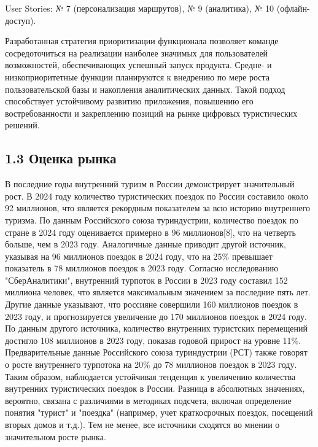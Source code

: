 User Stories: № 7 (персонализация маршрутов), № 9 (аналитика), № 10 (офлайн-доступ).

Разработанная стратегия приоритизации функционала позволяет команде сосредоточиться на реализации наиболее значимых для пользователей возможностей, обеспечивающих успешный запуск продукта. Средне- и низкоприоритетные функции планируются к внедрению по мере роста пользовательской базы и накопления аналитических данных. Такой подход способствует устойчивому развитию приложения, повышению его востребованности и закреплению позиций на рынке цифровых туристических решений.


\subsection*{1.3	Оценка рынка}


В последние годы внутренний туризм в России демонстрирует значительный рост. В 2024 году количество туристических поездок по России составило около 92 миллионов, что является рекордным показателем за всю историю внутреннего туризма. По данным Российского союза туриндустрии, количество поездок по стране в 2024 году оценивается примерно в 96 миллионов[8], что на четверть больше, чем в 2023 году. Аналогичные данные приводит другой источник, указывая на 96 миллионов поездок в 2024 году, что на 25\% превышает показатель в 78 миллионов поездок в 2023 году. Согласно исследованию "СберАналитики", внутренний турпоток в России в 2023 году составил 152 миллиона человек, что является максимальным значением за последние пять лет. Другие данные указывают, что россияне совершили 160 миллионов поездок в 2023 году, и прогнозируется увеличение до 170 миллионов поездок в 2024 году. По данным другого источника, количество внутренних туристских перемещений достигло 108 миллионов в 2023 году, показав годовой прирост на уровне 11\%. Предварительные данные Российского союза туриндустрии (РСТ) также говорят о росте внутреннего турпотока на 20\% до 78 миллионов поездок в 2023 году. Таким образом, наблюдается устойчивая тенденция к увеличению количества внутренних туристических поездок в России. Разница в абсолютных значениях, вероятно, связана с различиями в методиках подсчета, включая определение понятия "турист" и "поездка" (например, учет краткосрочных поездок, посещений вторых домов и т.д.). Тем не менее, все источники сходятся во мнении о значительном росте рынка.

